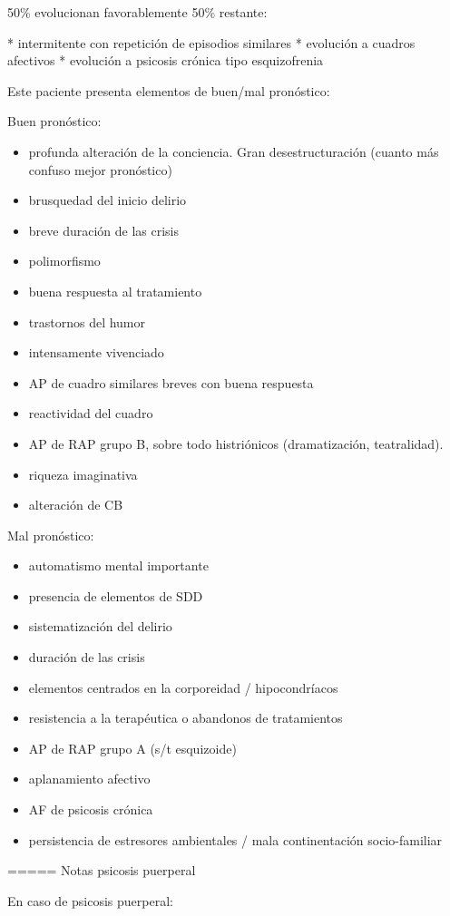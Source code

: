 50\% evolucionan favorablemente 50\% restante:

* intermitente con repetición de episodios similares
* evolución a cuadros afectivos
* evolución a psicosis crónica tipo esquizofrenia

Este paciente presenta elementos de buen/mal pronóstico:

Buen pronóstico:
\begin{itemize}
\item profunda alteración de la conciencia. Gran desestructuración (cuanto más confuso mejor pronóstico)
\item brusquedad del inicio delirio
\item breve duración de las crisis
\item polimorfismo
\item buena respuesta al tratamiento
\item trastornos del humor
\item intensamente vivenciado
\item AP de cuadro similares breves con buena respuesta
\item reactividad del cuadro
\item AP de RAP grupo B, sobre todo histriónicos (dramatización, teatralidad).
\item riqueza imaginativa
\item alteración de CB
\end{itemize}
Mal pronóstico:
\begin{itemize}
	\item automatismo mental importante
	\item presencia de elementos de SDD
	\item sistematización del delirio
	\item duración de las crisis
	\item elementos centrados en la corporeidad / hipocondríacos
	\item resistencia a la terapéutica o abandonos de tratamientos
	\item AP de RAP grupo A (s/t esquizoide)
	\item aplanamiento afectivo
	\item AF de psicosis crónica
	\item persistencia de estresores ambientales / mala continentación socio-familiar
\end{itemize}

===== Notas psicosis puerperal

En caso de psicosis puerperal:

